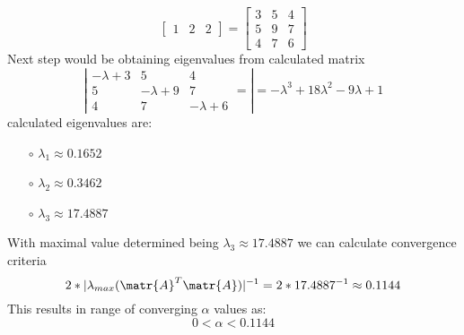 \begin{itemize}
\begin{equation*}
\begin{bmatrix}
        1 & 2 & 2
      \end{bmatrix} = 
      \begin{bmatrix}
          3 & 5 & 4 \\
          5 & 9 & 7 \\
          4 & 7 & 6
      \end{bmatrix}
  \end{equation*}
  Next step would be obtaining eigenvalues from calculated matrix 
  \begin{equation*}
    \left|\begin{matrix}
      -\lambda+3 & 5 & 4 \\
      5 & -\lambda+9 & 7 \\
      4 & 7 & -\lambda+6
      \end{matrix}=\right|
      = -\lambda^3 + 18\lambda^2 - 9\lambda + 1
  \end{equation*}
  calculated eigenvalues are: 
  \begin{multicols}{3}
    \begin{itemize}
      \item[$\circ$] $\lambda_1 \approx 0.1652 $
      \par
      \item[$\circ$] $\lambda_2 \approx 0.3462 $
      \par
      \item[$\circ$] $\lambda_3 \approx 17.4887 $
    \end{itemize}
  \end{multicols}
  With maximal value determined being $\lambda_3 \approx 17.4887$ we can calculate convergence criteria 
  \begin{equation*}
    2 * |\lambda_{max}(\matr{A}^T\matr{A})|^{-1} = 2 * 17.4887^{-1} \approx 0.1144
  \end{equation*}
  This results in range of converging $\alpha$ values as:
  \begin{equation*}
    0 < \alpha < 0.1144
  \end{equation*}
\end{itemize}
